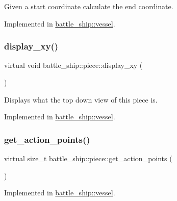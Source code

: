 Given a start coordinate calculate the end coordinate. 



Implemented in \hyperlink{classbattle__ship_1_1vessel_a9b99c5ed2629203985b25338df585234}{battle\+\_\+ship\+::vessel}.

\mbox{\label{classbattle__ship_1_1piece_a0f900b13641277ae9e809e4baa5c8c10}} 
\subsubsection{\texorpdfstring{display\+\_\+xy()}{display\_xy()}}
{\footnotesize\ttfamily virtual void battle\+\_\+ship\+::piece\+::display\+\_\+xy (\begin{DoxyParamCaption}{ }\end{DoxyParamCaption})\hspace{0.3cm}{\ttfamily [pure virtual]}}



Displays what the top down view of this piece is. 



Implemented in \hyperlink{classbattle__ship_1_1vessel_a60924b058d686ebf545ae8f4d9f42d76}{battle\+\_\+ship\+::vessel}.

\mbox{\label{classbattle__ship_1_1piece_a63f00d666a65cd41a11b592d55411b7f}} 
\subsubsection{\texorpdfstring{get\+\_\+action\+\_\+points()}{get\_action\_points()}}
{\footnotesize\ttfamily virtual size\+\_\+t battle\+\_\+ship\+::piece\+::get\+\_\+action\+\_\+points (\begin{DoxyParamCaption}{ }\end{DoxyParamCaption})\hspace{0.3cm}{\ttfamily [pure virtual]}}



Implemented in \hyperlink{classbattle__ship_1_1vessel_a398b4134137d9e11c13e6aee548e1802}{battle\+\_\+ship\+::vessel}.

